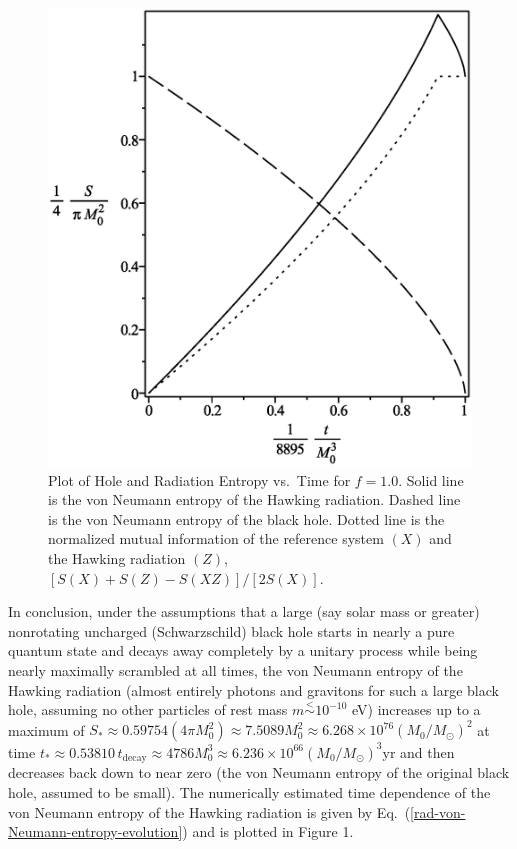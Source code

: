\documentclass[12pt]{article}
\begin{document}
\begin{figure}[H]
\centering
\includegraphics[width=1\textwidth]{Hawking-hole-radiation-mutual-entropy-vs-time-graph-10f-is-10.eps}
\caption{Plot of Hole and Radiation Entropy vs.\ Time for $f=1.0$.
Solid line is the von Neumann entropy of the Hawking radiation.
Dashed line is the von Neumann entropy of the black hole.
Dotted line is the normalized mutual information of the reference system $(X)$ and the Hawking radiation $(Z)$, $[S(X)+S(Z)-S(XZ)]/[2S(X)]$.}
\end{figure}


In conclusion, under the assumptions that a large (say solar mass or greater) nonrotating uncharged (Schwarzschild) black hole starts in nearly a pure quantum state and decays away completely by a unitary process while being nearly maximally scrambled at all times, the von Neumann entropy of the Hawking radiation (almost entirely photons and gravitons for such a large black hole, assuming no other particles of rest mass $m \stackrel{<}{\sim} 10^{-10}$ eV) increases up to a maximum of $S_\ast \approx 0.59754(4\pi M_0^2) \approx 7.5089 M_0^2 \approx 6.268\times 10^{76} (M_0/M_\odot)^2$ at time $t_\ast \approx 0.53810\, t_\mathrm{decay} \approx 4786 M_0^3 \approx 6.236\times 10^{66}(M_0/M_\odot)^3\mathrm{yr}$ and then decreases back down to near zero (the von Neumann entropy of the original black hole, assumed to be small).  The numerically estimated time dependence of the von Neumann entropy of the Hawking radiation is given by Eq.\ (\ref{rad-von-Neumann-entropy-evolution}) and is plotted in Figure 1.
\end{document}
